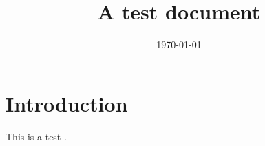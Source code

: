 \documentclass{article}
\title{A test document}
\date{\today}
\begin{document}
\maketitle

\section{Introduction}

This is a test \citep{knittel2018working}.



\end{document}

